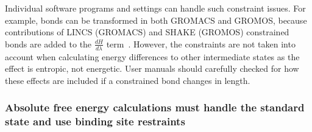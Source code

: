 \documentclass[9pt,bestpractices]{livecoms}
\begin{document}
Individual software programs and settings can handle such constraint issues. For example, bonds can be transformed in both GROMACS and GROMOS, because contributions of LINCS (GROMACS) and SHAKE (GROMOS) constrained bonds are added to the $\frac{dH}{d\lambda}$ term~\cite{pearlman1993determining, straatsma1992holonomic, pearlman1991overlooked, gunsteren1989computer}. However, the constraints are not taken into account when calculating energy differences to other intermediate states as the effect is entropic, not energetic. User manuals should carefully checked for how these effects are included if a constrained bond changes in length. 

\subsubsection{Absolute free energy calculations must handle the standard state and use binding site restraints}
\label{sec:standardstate-restraints}
\end{document}
